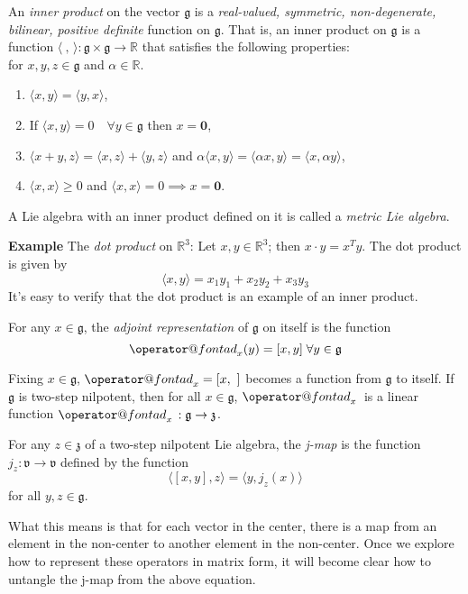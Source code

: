 \documentclass[11 pt]{article}
\makeatletter
\renewcommand{\a}{\alpha}
\newcommand{\br}[2]{\left[#1,#2\right]}
\newcommand{\inp}[2]{\langle #1, #2 \rangle}
\newcommand{\inpe}{\inp{\ }{\,}}
\newcommand{\lag}[1]{\mathfrak{#1}}
\newcommand{\R}{\mathbb{R}}
\newcommand{\fg}{\mathfrak{g}}
\newcommand{\fz}{\mathfrak{z}}
\newcommand{\fv}{\mathfrak{v}}
\newcommand{\zvec}{\mathbf{0}}
\newcommand{\RR}{\mathbb{R}}
\newcommand{\ad}[1]{\mathop{\operator@font ad}\nolimits_{#1}}
\makeatother
\begin{document}
\begin{definition}
    An \emph{inner product} on the vector $\fg$ is a
    \emph{real-valued, symmetric, non-degenerate, bilinear, positive definite}
    function on $\fg$.  That is, an inner product on $\fg$ is a function
    $\inpe:\fg\times\fg\to\RR$ that satisfies the
    following properties:
    \\for $x,y,z \in \fg$ and $\a \in \RR$.
    \begin{enumerate}
        \item $\langle x,y \rangle = \langle y,x \rangle$,
        \item If $\langle x,y \rangle = 0 \quad \forall y \in \fg$
            then $x = \zvec$,
        \item
            $\langle x+y,z \rangle = \langle x,z \rangle + \langle y,z \rangle$
            and $\a \langle x,y \rangle = \langle \a x,y \rangle
            = \langle x,\a y \rangle$,
        \item $\langle x,x \rangle \geq 0$
            and $\langle x,x\rangle = 0 \implies x=\zvec$.
    \end{enumerate}
    A Lie algebra with an inner product defined on it is called a
    \emph{metric Lie algebra}.
\end{definition}
{\bf Example} The \emph{dot product} on $\R^3$:
Let $x, y \in \R^3$; then $x \cdot y = x^Ty$.  The dot product is given by
\[
    \langle x,y \rangle =  x_1y_1 + x_2y_2 + x_3y_3
\]
It's easy to verify that the dot product is an example of an inner product.

\begin{definition}
    For any $x \in \fg$, the \emph{adjoint representation} of $\fg$ on itself is
    the function
    \[
        \ad{x}(y) = [x,y] \; \forall y \in \fg
    \]
\end{definition}

Fixing $x \in \lag{g}$, $\ad{x} = \br{x}{\ }$ becomes a function from
$\lag{g}$ to itself.  If $\fg$ is two-step nilpotent, then for all
$x \in \fg$, $\ad{x}{}$ is a linear function $\ad{x}{}: \fg \to \fz$.

\begin{definition}
    For any $z \in \fz$ of a two-step nilpotent Lie algebra, the \emph{j-map} is
    the function $j_z :\fv \to \fv$ defined by the function
    \[
    \langle\br{x}{y},z\rangle = \langle y,j_z(x)\rangle
    \]
    for all $y, z \in \lag{g}$.
\end{definition}

What this means is that for each vector in the center, there is a map from an
element in the non-center to another element in the non-center.  Once we
explore how to represent these operators in matrix form, it will become clear
how to untangle the j-map from the above equation.
\end{document}
